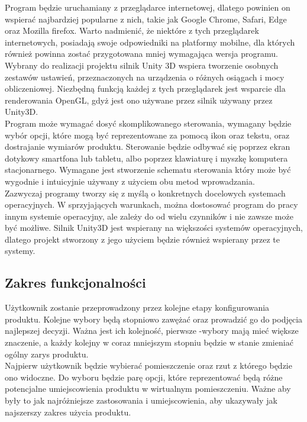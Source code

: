 \documentclass{article} %
\begin{document}
        Program będzie uruchamiany z przeglądarce internetowej, dlatego powinien on wspierać najbardziej popularne z nich, takie jak Google Chrome, Safari, Edge oraz Mozilla firefox. Warto nadmienić, że niektóre z tych przeglądarek internetowych, posiadają swoje odpowiedniki na platformy mobilne, dla których również powinna zostać przygotowana mniej wymagająca wersja programu. Wybrany do realizacji projektu silnik Unity 3D wspiera tworzenie osobnych zestawów ustawień, przeznaczonych na urządzenia o różnych osiągach i mocy obliczeniowej. Niezbędną funkcją każdej z tych przeglądarek jest wsparcie dla renderowania OpenGL, gdyż jest ono używane przez silnik używany przez Unity3D.
        \\
        
        Program może wymagać dosyć skomplikowanego sterowania, wymagany będzie wybór opcji, które mogą być reprezentowane za pomocą ikon oraz tekstu, oraz dostrajanie wymiarów produktu. Sterowanie będzie odbywać się poprzez ekran dotykowy smartfona lub tabletu, albo poprzez klawiaturę i myszkę komputera stacjonarnego. Wymagane jest stworzenie schematu sterowania który może być wygodnie i intuicyjnie używany z użyciem obu metod wprowadzania.
        \\
        
        Zazwyczaj programy tworzy się z myślą o konkretnych docelowych systemach operacyjnych. W sprzyjających warunkach, można dostosować program do pracy innym systemie operacyjny, ale zależy do od wielu czynników i nie zawsze może być możliwe. Silnik Unity3D jest wspierany na większości systemów operacyjnych, dlatego projekt stworzony z jego użyciem będzie również wspierany przez te systemy.
        \\
        
        
    \subsection{Zakres funkcjonalności}
        Użytkownik zostanie przeprowadzony przez kolejne etapy konfigurowania produktu. Kolejne wybory będą stopniowo zawężać oraz prowadzić go do podjęcia najlepszej decyzji. Ważna jest ich kolejność, pierwsze -wybory mają mieć większe znaczenie, a każdy kolejny w coraz mniejszym stopniu będzie w stanie zmieniać ogólny zarys produktu.
        \\
        
        Najpierw użytkownik będzie wybierać pomieszczenie oraz rzut z którego będzie ono widoczne. Do wyboru będzie parę opcji, które reprezentować będą różne potencjalne umiejscowienia produktu w wirtualnym pomieszczeniu. Ważne aby były to jak najróżniejsze zastosowania i umiejscowienia, aby ukazywały jak najszerszy zakres użycia produktu. 
        \\
        
\end{document}
